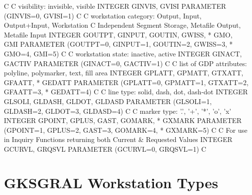 \begin{XMP}
C
C visibility: invisible, visible
      INTEGER     GINVIS,    GVISI
      PARAMETER  (GINVIS=0,  GVISI=1)
C
C workstation category: Output, Input, Output+Input, Workstation
C Independent Segment Storage, Metafile Output, Metafile Input
      INTEGER     GOUTPT,     GINPUT,    GOUTIN,    GWISS,
     *            GMO,        GMI
      PARAMETER  (GOUTPT=0,   GINPUT=1,  GOUTIN=2,  GWISS=3,
     *            GMO=4,      GMI=5)
C
C workstation state:  inactive, active
      INTEGER     GINACT,    GACTIV
      PARAMETER  (GINACT=0,  GACTIV=1)
C
C list of GDP attributes:  polyline, polymarker, text, fill area
      INTEGER     GPLATT,    GPMATT,    GTXATT,    GFAATT,
     *            GEDATT
      PARAMETER  (GPLATT=0,  GPMATT=1,  GTXATT=2,  GFAATT=3,
     *            GEDATT=4)
C
C line type:    solid,   dash,   dot,   dash-dot
      INTEGER     GLSOLI,    GLDASH,    GLDOT,     GLDASD
      PARAMETER  (GLSOLI=1,  GLDASH=2,  GLDOT=3,   GLDASD=4)
C
C marker type:   '.',   '+',   '*',   'o',   'x'
      INTEGER     GPOINT,    GPLUS,     GAST,      GOMARK,
     *            GXMARK
      PARAMETER  (GPOINT=1,  GPLUS=2,   GAST=3,    GOMARK=4,
     *            GXMARK=5)
C
C For use in Inquiry Functions returning both Current & Requested Values
      INTEGER     GCURVL,    GRQSVL
      PARAMETER  (GCURVL=0,  GRQSVL=1)
C
\end{XMP}
\chapter{\protect\label{sec:gtstyp}GKSGRAL Workstation Types}
 
